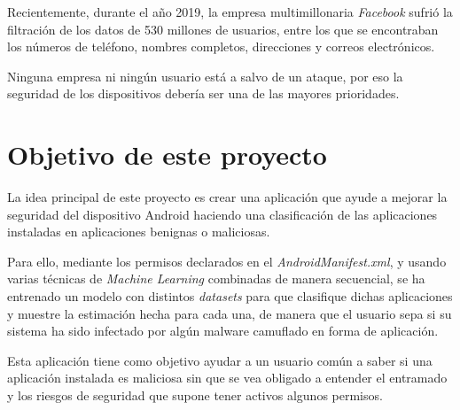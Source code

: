 Recientemente, durante el año 2019, la empresa multimillonaria \textit{Facebook} sufrió la filtración de los datos de 530 millones de usuarios, entre los que se encontraban los números de teléfono, nombres completos, direcciones y correos electrónicos\hypersetup{citecolor=red}\cite{fb}.

Ninguna empresa ni ningún usuario está a salvo de un ataque, por eso la seguridad de los dispositivos debería ser una de las mayores prioridades.

\section{Objetivo de este proyecto}

La idea principal de este proyecto es crear una aplicación que ayude a mejorar la seguridad del dispositivo Android haciendo una clasificación de las aplicaciones instaladas en aplicaciones benignas o maliciosas.

Para ello, mediante los permisos declarados en el \textit{AndroidManifest.xml}, y usando varias técnicas de \textit{Machine Learning} combinadas de manera secuencial, se ha entrenado un modelo con distintos \textit{datasets} para que clasifique dichas aplicaciones y muestre la estimación hecha para cada una, de manera que el usuario sepa si su sistema ha sido infectado por algún malware camuflado en forma de aplicación.

Esta aplicación tiene como objetivo ayudar a un usuario común a saber si una aplicación instalada es maliciosa sin que se vea obligado a entender el entramado y los riesgos de seguridad que supone tener activos algunos permisos.